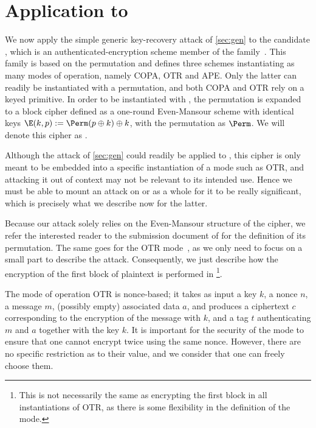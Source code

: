 \section{Application to \proestotr}
\label{sec:appli}

We now apply the simple generic key-recovery attack of \autoref{sec:gen} to the \caesar candidate \proestotr, which is an authenticated-encryption
scheme member of the \proest family~\cite{proest}. This family is based on the \proest permutation and defines
three schemes instantiating as many modes of operation, namely COPA, OTR and APE. Only
the latter can readily be instantiated with a permutation, and both COPA and OTR rely on a keyed primitive. In order
to be instantiated with \proest, the permutation is expanded to a block cipher
defined as a one-round Even-Mansour scheme with identical keys
$\E(k,p) := \Perm(p \oplus k) \oplus k$,
with the \proest permutation as $\Perm$. We will denote this cipher as \proestem.

Although the attack of \autoref{sec:gen} could readily be applied to \proestem, this cipher is only
meant to be embedded into a specific instantiation of a mode such as OTR, and attacking it out of context may not
be relevant to its intended use.
Hence we must
be able to mount an attack on \proestcopa or \proestotr as a whole for it to be really significant,
which is precisely what we describe now for the latter.

Because our attack solely relies on the Even-Mansour structure of the cipher, we refer the interested reader to the
submission document of \proest for the definition of its permutation.
The same goes for the OTR mode~\cite{M14}, as we only need to focus on a small part to describe the attack.
Consequently, we just describe how the encryption of the first block of plaintext is performed in \proestotr\footnote{This is not necessarily the
same as encrypting the first block in all instantiations of OTR, as there is some flexibility in the definition of the mode.}.

\medskip

The mode of operation OTR is nonce-based; it takes as input a key $k$, a nonce $n$, a message $m$,
(possibly empty) associated data $a$, and produces a ciphertext $c$ corresponding
to the encryption of the message with $k$, and a tag $t$ authenticating $m$ and
$a$ together with the key $k$. It is important for the security of the mode to ensure
that one cannot encrypt twice using the same nonce. However, there are no
specific restriction as to their value, and we consider that one
can freely choose them.

